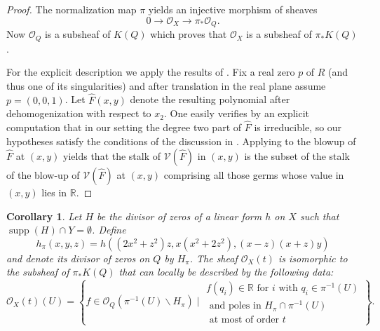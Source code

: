\documentclass[a4paper,10pt]{amsart}
\theoremstyle{definition}
\theoremstyle{plain}
\newtheorem{cor}[Def]{Corollary}
\newcommand{\cO}{{\mathcal O}}
\newcommand{\cV}{{\mathcal V}}
\newcommand{\R}{{\mathbb R}}
\begin{document}
\begin{proof}
 The normalization map $\pi$ yields an injective morphism of sheaves
 \begin{equation*}
  0 \to \cO_X \to \pi_*\cO_Q.
 \end{equation*}
 Now $\cO_Q$ is a subsheaf of $K(Q)$ which proves that $\cO_X$ is a subsheaf of $\pi_*K(Q)$.
 
 For the explicit description we apply the results of . Fix a real zero $p$ of $R$ (and thus one of its singularities) and after translation in the real plane assume $p = (0,0,1)$. Let $\hat{F}(x,y)$ denote the resulting polynomial after dehomogenization with respect to $x_2$. One easily verifies by an explicit computation that in our setting the degree two part of $\hat{F}$ is irreducible, so our hypotheses satisfy the conditions of the discussion in . Applying  to the blowup of $\hat{F}$ at $(x,y)$ yields that the stalk of $\cV(\hat{F})$ in $(x,y)$ is the subset of the stalk of the blow-up of $\cV(\hat{F})$ at $(x,y)$ comprising all those germs whose value in $(x,y)$ lies in $\R$.
\end{proof}


\begin{cor}
 Let $H$ be the divisor of zeros of a linear form $h$ on $X$ such that $\operatorname{supp}(H) \cap Y = \emptyset$. Define
 \begin{equation*}
  h_\pi(x,y,z) = h((2x^2+z^2)z,x(x^2+2z^2),(x-z)(x+z)y)
 \end{equation*}
 and denote its divisor of zeros on $Q$ by $H_\pi$. The sheaf $\cO_X(t)$ is isomorphic to the subsheaf of $\pi_*K(Q)$ that can locally be described by the following data:
 \begin{equation*}
  \cO_X(t)(U) = \left\lbrace f \in \cO_Q(\pi^{-1}(U)\backslash H_\pi) \mid
  \begin{array}{c}
   f(q_i)\in \R \text{ for } i \text{ with } q_i \in \pi^{-1}(U) \\  \text{ and }
   \text{poles in } H_\pi \cap \pi^{-1}(U) \\ \text{ at most of order } t 
  \end{array} \right\rbrace.
 \end{equation*}
\end{cor}
\end{document}

